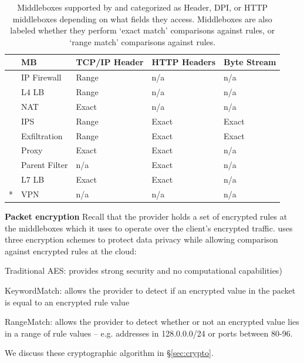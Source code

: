 \begin{table}
\centering
\small
\hspace{-2pt}
\begin{tabular}{l|l|p{.45in}|p{.45in}|p{.45in}}
&{\bf MB}&{\bf TCP/IP Header}&{\bf HTTP Headers}&{\bf Byte Stream}\\

\hline

\parbox[t]{1mm}{}
&IP Firewall&Range&n/a&n/a\\
&L4 LB&Range&n/a&n/a\\
&NAT&Exact&n/a&n/a\\
\hline


\parbox[t]{1mm}{}
&IPS&Range&Exact&Exact\\
&Exfiltration&Range&Exact&Exact\\
\hline

\parbox[t]{1mm}{}
&Proxy&Exact&Exact&n/a\\
&Parent Filter&n/a&Exact&n/a\\
&L7 LB&Exact&Exact&n/a\\
\hline
*&VPN&n/a&n/a&n/a\\

\end{tabular}
\caption[]{Middleboxes supported by \sys and categorized as Header, DPI, or HTTP middleboxes depending on what fields they access. Middleboxes are also labeled whether they perform `exact match' comparisons against rules, or `range match' comparisons against rules.\label{tbl:mbreqs}}

\end{table}



\noindent\textbf{Packet encryption}
Recall that the provider holds a set of encrypted rules at the middleboxes which it uses to operate over the client's encrypted traffic.
\sys uses three encryption schemes to protect data privacy while allowing comparison against encrypted rules at the cloud: 
\begin{myitemize}
\item Traditional AES: provides strong security and no computational capabilities)
\item KeywordMatch:  allows the provider to detect if an encrypted value in the packet is equal to an encrypted rule value
\item RangeMatch: allows the provider to detect whether or not an encrypted value lies in a range of rule values -- e.g. addresses in 128.0.0.0/24 or ports between 80-96.
\end{myitemize}
We discuss these cryptographic algorithm in \S\ref{sec:crypto}.

